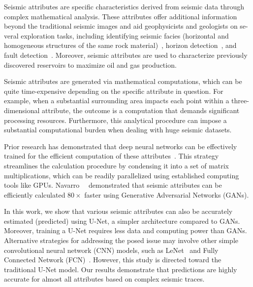 \documentclass[conference]{IEEEtran}
\def\unet{\mbox{U-Net}\xspace}
\begin{document}
Seismic attributes are specific characteristics derived from seismic data through complex mathematical analysis. 
These attributes offer additional information beyond the traditional seismic images and aid geophysicists and geologists on se-veral exploration tasks, including identifying seismic facies (horizontal and homogeneous structures of the same rock material)~\cite{zhao2015comparison,napoli2021accelerating}, horizon detection~\cite{yang2020seismic}, and fault detection~\cite{wu2019faultseg3d}. 
Moreover, seismic attributes are used to characterize previously discovered reservoirs to maximize oil and gas production.


Seismic attributes are generated via mathematical computations, which can be quite time-expensive depending on the specific attribute in question. 
For example, when a substantial surrounding area impacts each point within a three-dimensional attribute, the outcome is a computation that demands significant processing resources. 
Furthermore, this analytical procedure can impose a substantial computational burden when dealing with huge seismic datasets.

Prior research has demonstrated that deep neural networks can be effectively trained for the efficient computation of these attributes~\cite{SEG20-navarro-seismic-attr}. 
This strategy streamlines the calculation procedure by condensing it into a set of matrix multiplications, which can be readily parallelized using established computing tools like GPUs. Navarro~\etal~\cite{SEG20-navarro-seismic-attr} demonstrated that seismic attributes can be efficiently calculated $80\times$ faster using Generative Adversarial Networks (GANs). 


In this work, we show that various seismic attributes can also be accurately estimated (predicted) using \unet, a simpler architecture compared to GANs. Moreover, training a \unet requires less data and computing power than GANs. Alternative strategies for addressing the posed issue may involve other simple convolutional neural network (CNN) models, such as LeNet~\cite{lenet} and Fully Connected Network (FCN)~\cite{FCN,fcnBorin}. However, this study is directed toward the traditional \unet model.
Our results demonstrate that predictions are highly accurate for almost all attributes based on complex seismic traces.
\end{document}
